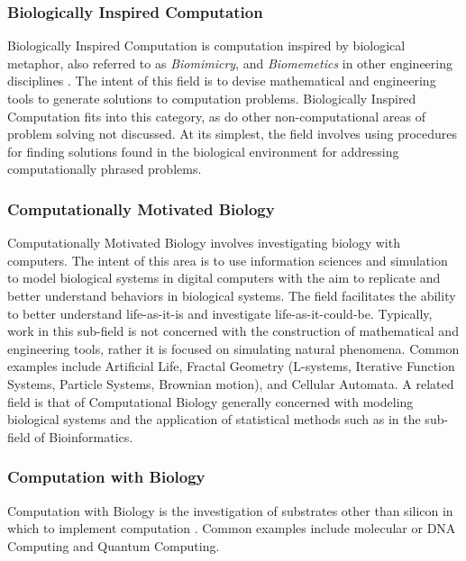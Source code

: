 \subsubsection{Biologically Inspired Computation}
Biologically Inspired Computation is computation inspired by biological metaphor, also referred to as \emph{Biomimicry}, and \emph{Biomemetics} in other engineering disciplines \cite{Castro2005, Benyus1998}. The intent of this field is to devise mathematical and engineering tools to generate solutions to computation problems. Biologically Inspired Computation fits into this category, as do other non-computational areas of problem solving not discussed. At its simplest, the field involves using procedures for finding solutions found in the biological environment for addressing computationally phrased problems.

\subsubsection{Computationally Motivated Biology}
Computationally Motivated Biology involves investigating biology with computers. The intent of this area is to use information sciences and simulation to model biological systems in digital computers with the aim to replicate and better understand behaviors in biological systems. The field facilitates the ability to better understand life-as-it-is and investigate life-as-it-could-be. Typically, work in this sub-field is not concerned with the construction of mathematical and engineering tools, rather it is focused on simulating natural phenomena. Common examples include Artificial Life, Fractal Geometry (L-systems, Iterative Function Systems, Particle Systems, Brownian motion), and Cellular Automata. A related field is that of Computational Biology generally concerned with modeling biological systems and the application of statistical methods such as in the sub-field of Bioinformatics.

\subsubsection{Computation with Biology}
Computation with Biology is the investigation of substrates other than silicon in which to implement computation \cite{Aaronson2005}. Common examples include molecular or DNA Computing and Quantum Computing.

% 
% 
